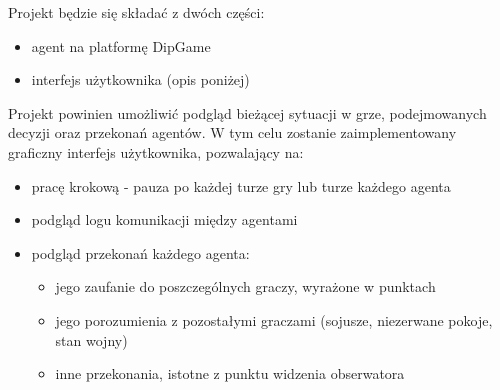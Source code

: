 Projekt będzie się składać z dwóch części:
\begin{itemize}
	\item{agent na platformę DipGame}
	\item{interfejs użytkownika (opis poniżej)}
\end{itemize}

Projekt powinien umożliwić podgląd bieżącej sytuacji w grze, podejmowanych decyzji oraz przekonań agentów. W tym celu zostanie zaimplementowany graficzny interfejs użytkownika, pozwalający na:
\begin{itemize}
	\item{pracę krokową - pauza po każdej turze gry lub turze każdego agenta}
	\item{podgląd logu komunikacji między agentami}
	\item{podgląd przekonań każdego agenta:}
	\begin{itemize}
		\item{jego zaufanie do poszczególnych graczy, wyrażone w punktach}
		\item{jego porozumienia z pozostałymi graczami (sojusze, niezerwane pokoje, stan wojny)}
		\item{inne przekonania, istotne z punktu widzenia obserwatora}
	\end{itemize}
\end{itemize}
